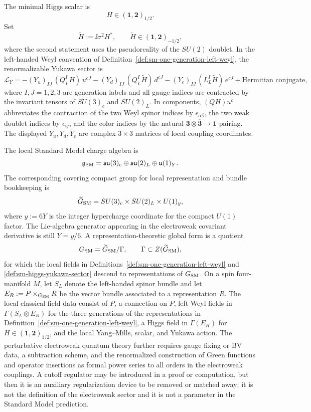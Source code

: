 \begin{definition}
\label{def:sm-higgs-yukawa-sector}
The minimal Higgs scalar is
\[
  H\in(\mathbf1,\mathbf2)_{1/2}.
\]
Set
\[
  \widetilde H:=\ii\sigma^2H^*,
  \qquad
  \widetilde H\in(\mathbf1,\mathbf2)_{-1/2},
\]
where the second statement uses the pseudoreality of the \(SU(2)\) doublet.
In the left-handed Weyl convention of
Definition~\ref{def:sm-one-generation-left-weyl}, the renormalizable Yukawa
sector is
\[
  \mathcal L_Y
  =
  - (Y_u)_{IJ}\,(Q_L^I H)\,u^{cJ}
  - (Y_d)_{IJ}\,(Q_L^I\widetilde H)\,d^{cJ}
  - (Y_e)_{IJ}\,(L_L^I\widetilde H)\,e^{cJ}
  + \text{Hermitian conjugate},
\]
where \(I,J=1,2,3\) are generation labels and all gauge indices are contracted
by the invariant tensors of \(SU(3)_c\) and \(SU(2)_L\).  In components,
\((QH)u^c\) abbreviates the contraction of the two Weyl spinor indices by
\(\epsilon_{\alpha\beta}\), the two weak doublet indices by
\(\epsilon_{ij}\), and the color indices by the natural
\(\mathbf3\otimes\overline{\mathbf3}\to\mathbf1\) pairing.  The displayed
\(Y_u,Y_d,Y_e\) are complex \(3\times3\) matrices of local coupling
coordinates.
\end{definition}

\begin{definition}
\label{def:local-standard-model-charge-bundle-data}
The local Standard Model charge algebra is
\[
  \mathfrak g_{\rm SM}
  =
  \mathfrak{su}(3)_c\oplus\mathfrak{su}(2)_L\oplus\mathfrak u(1)_Y .
\]
The corresponding covering compact group for local representation and bundle
bookkeeping is
\[
  \widetilde G_{\rm SM}=SU(3)_c\times SU(2)_L\times U(1)_y ,
\]
where \(y:=6Y\) is the integer hypercharge coordinate for the compact
\(U(1)\) factor.  The Lie-algebra generator appearing in the electroweak
covariant derivative is still \(Y=y/6\).
A representation-theoretic global form is a quotient
\[
  G_{\rm SM}=\widetilde G_{\rm SM}/\Gamma ,
  \qquad
  \Gamma\subset Z(\widetilde G_{\rm SM}),
\]
for which the local fields in
Definitions~\ref{def:sm-one-generation-left-weyl} and
\ref{def:sm-higgs-yukawa-sector} descend to representations of
\(G_{\rm SM}\).  On a spin four-manifold \(M\), let \(S_L\) denote the
left-handed spinor bundle and let \(E_R:=P\times_{G_{\rm SM}}R\) be the vector
bundle associated to a representation \(R\).  The local classical field data
consist of \(P\), a connection on \(P\), left-Weyl fields in
\(\Gamma(S_L\otimes E_R)\) for the three generations of the representations
in Definition~\ref{def:sm-one-generation-left-weyl}, a Higgs field in
\(\Gamma(E_H)\) for \(H\in(\mathbf1,\mathbf2)_{1/2}\), and the local
Yang--Mills, scalar, and Yukawa action.  The perturbative electroweak quantum
theory further requires gauge fixing or BV data, a subtraction scheme, and the
renormalized construction of Green functions and operator insertions as formal
power series to all orders in the electroweak couplings.  A cutoff regulator
may be introduced in a proof or computation, but then it is an auxiliary
regularization device to be removed or matched away; it is not the definition
of the electroweak sector and it is not a parameter in the Standard Model
prediction.
\end{definition}

